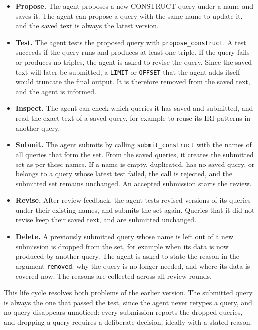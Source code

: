 \begin{itemize}[leftmargin=*, itemsep=2pt]
  \item \textbf{Propose.} The agent proposes a new CONSTRUCT query under a name and saves it. The agent can propose a query with the same name to update it, and the saved text is always the latest version.
  \item \textbf{Test.} The agent tests the proposed query with \texttt{propose\_construct}. A test succeeds if the query runs and produces at least one triple. If the query fails or produces no triples, the agent is asked to revise the query. Since the saved text will later be submitted, a \texttt{LIMIT} or \texttt{OFFSET} that the agent adds itself would truncate the final output. It is therefore removed from the saved text, and the agent is informed.
  \item \textbf{Inspect.} The agent can check which queries it has saved and submitted, and read the exact text of a saved query, for example to reuse its IRI patterns in another query.
  \item \textbf{Submit.} The agent submits by calling \texttt{submit\_construct} with the names of all queries that form the set. From the saved queries, it creates the submitted set as per these names. If a name is empty, duplicated, has no saved query, or belongs to a query whose latest test failed, the call is rejected, and the submitted set remains unchanged. An accepted submission starts the review.
  \item \textbf{Revise.} After review feedback, the agent tests revised versions of its queries under their existing names, and submits the set again. Queries that it did not revise keep their saved text, and are submitted unchanged.
  \item \textbf{Delete.} A previously submitted query whose name is left out of a new submission is dropped from the set, for example when its data is now produced by another query. The agent is asked to state the reason in the argument \texttt{removed}: why the query is no longer needed, and where its data is covered now. The reasons are collected across all review rounds.
\end{itemize}
This life cycle resolves both problems of the earlier version. The submitted query is always the one that passed the test, since the agent never retypes a query, and no query disappears unnoticed: every submission reports the dropped queries, and dropping a query requires a deliberate decision, ideally with a stated reason.

